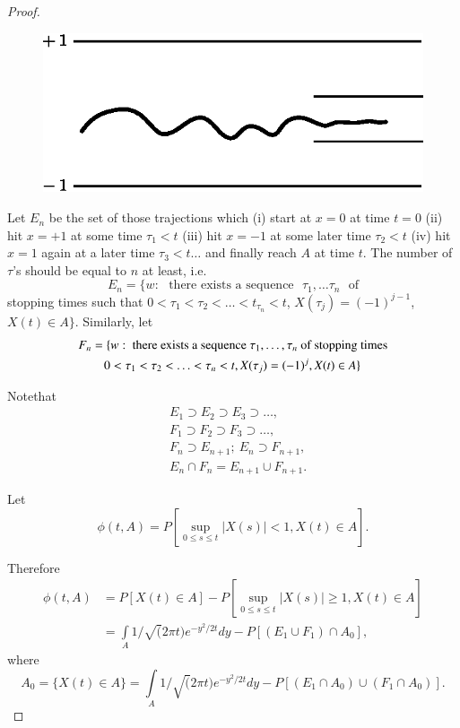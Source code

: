 \eject

\begin{proof}
~

\begin{figure}[H]
\centering
\includegraphics{figure/fig7.eps}
\end{figure}

Let $E_{n}$ be the set of those trajections which (i) start at $x=0$
at time $t=0$ (ii) hit $x=+1$ at some time $\tau_{1}<t$ (iii) hit
$x=-1$ at some later time $\tau_{2}<t$ (iv) hit $x=1$ again at a later
time $\tau_{3}<t\ldots$ and finally reach $A$ at time $t$. The number
of $\tau$'s should be equal to $n$ at least, i.e.
$$
E_{n}=\{w:\text{~ there exists a sequence~ }
\tau_{1},\ldots\tau_{n}\text{~ of}
$$
stopping times such that $0<\tau_{1}<\tau_{2}<\ldots<t_{\tau_n}<t$,
$X(\tau_{j})=(-1)^{j-1}$, $X(t)\in A\}$. Similarly, let 
\begin{align*}
F_{n} &= \{w:\text{~ there exists a sequence~
}\tau_{1},\ldots,\tau_{n}\text{~ of stopping times}\\
&\quad 0<\tau_{1}<\tau_{2}<\ldots<\tau_{n}<t,X(\tau_{j})=(-1)^{j},X(t)\in A\}
\end{align*}

Note\pageoriginale that
\begin{align*}
& E_{1}\supset E_{2}\supset E_{3}\supset \ldots,\\
& F_{1}\supset F_{2}\supset F_{3}\supset \ldots,\\
& F_{n}\supset E_{n+1};\ E_{n}\supset F_{n+1},\\
& E_{n}\cap F_{n}=E_{n+1}\cup F_{n+1}.
\end{align*}

Let
$$
\phi(t,A)=P\left[\sup\limits_{0\leq s\leq t}|X(s)|<1,X(t)\in A\right].
$$

Therefore
\begin{align*}
\phi(t,A) &= P[X(t)\in A]-P\left[\sup\limits_{0\leq s\leq t}|X(s)|\geq
  1,X(t)\in A\right]\\
&= \int\limits_{A}1/\surd(2\pi t)e^{-y^{2}/2t}dy-P[(E_{1}\cup
  F_{1})\cap A_{0}],
\end{align*}
where 
$$
A_{0}=\{X(t)\in A\}=\int\limits_{A}1/\surd(2\pi
t)e^{-y^{2}/2t}dy-P[(E_{1}\cap A_{0})\cup (F_{1}\cap A_{0})].
$$


\end{proof}
